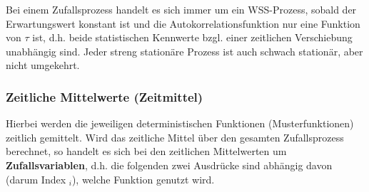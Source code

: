 Bei einem Zufallsprozess handelt es sich immer um ein WSS-Prozess, sobald der Erwartungswert
konstant ist und die Autokorrelationsfunktion nur eine Funktion von $\tau$ ist, d.h. beide 
statistischen Kennwerte bzgl. einer zeitlichen Verschiebung unabhängig sind.    
Jeder streng stationäre Prozess ist auch schwach stationär, aber nicht umgekehrt. 
        


\subsubsection{Zeitliche Mittelwerte (Zeitmittel)}
Hierbei werden die jeweiligen deterministischen Funktionen (Musterfunktionen) zeitlich gemittelt.
Wird das zeitliche Mittel über den gesamten Zufallsprozess berechnet, so handelt es sich bei den
zeitlichen Mittelwerten um \textbf{Zufallsvariablen}, d.h. die folgenden zwei Ausdrücke sind
abhängig davon (darum Index $_i$), welche Funktion genutzt wird.

